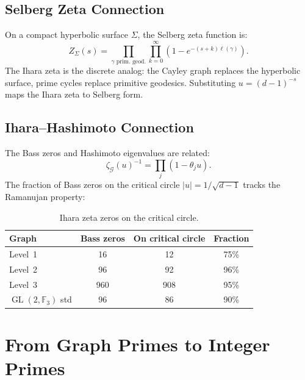 \documentclass[12pt,reqno]{amsart}
\theoremstyle{plain}
\theoremstyle{definition}
\theoremstyle{remark}
\DeclareMathOperator{\GL}{GL}
\newcommand{\FF}{\mathbb{F}}
\begin{document}
\subsection{Selberg Zeta Connection}

On a compact hyperbolic surface $\Sigma$, the Selberg zeta function
is:
\begin{equation}\label{eq:selberg}
  Z_\Sigma(s) = \prod_{\gamma \text{ prim.\ geod.}}
  \prod_{k=0}^\infty (1 - e^{-(s+k)\ell(\gamma)}).
\end{equation}
The Ihara zeta is the discrete analog: the Cayley graph replaces the
hyperbolic surface, prime cycles replace primitive geodesics.
Substituting $u = (d-1)^{-s}$ maps the Ihara zeta to Selberg form.

\subsection{Ihara--Hashimoto Connection}

The Bass zeros and Hashimoto eigenvalues are related:
\begin{equation}\label{eq:ihara_hashimoto}
  \zeta_\mathcal{G}(u)^{-1} = \prod_j (1 - \theta_j u).
\end{equation}
The fraction of Bass zeros on the critical circle $|u| =
1/\sqrt{d-1}$ tracks the Ramanujan property:

\begin{table}[h]
\centering
\begin{tabular}{lccc}
  \toprule
  Graph & Bass zeros & On critical circle & Fraction \\
  \midrule
  Level~1             & 16  & 12  & 75\% \\
  Level~2             & 96  & 92  & 96\% \\
  Level~3             & 960 & 908 & 95\% \\
  $\GL(2,\FF_3)$ std  & 96  & 86  & 90\% \\
  \bottomrule
\end{tabular}
\caption{Ihara zeta zeros on the critical circle.}
\label{tab:ihara_zeros}
\end{table}


\section{From Graph Primes to Integer Primes}\label{sec:lps}
\end{document}
